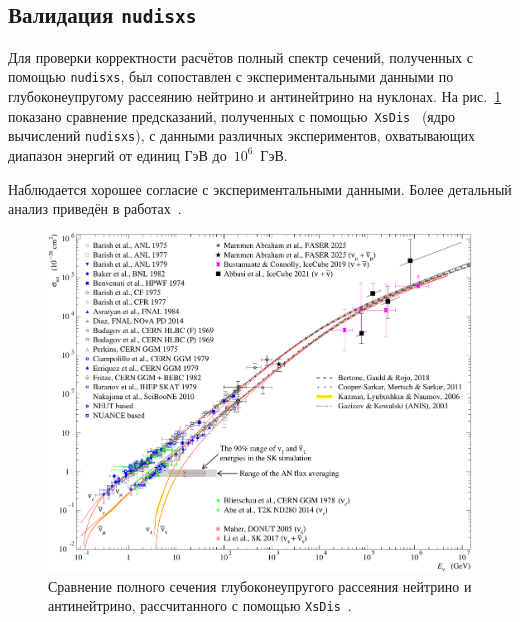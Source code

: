\subsection{Валидация \texttt{nudisxs}}

Для проверки корректности расчётов полный спектр сечений, полученных с помощью \texttt{nudisxs}, был сопоставлен с экспериментальными данными по глубоконеупругому рассеянию нейтрино и антинейтрино на нуклонах. 
На рис.~\ref{fig:disxs_compare} показано сравнение предсказаний, полученных с помощью~\texttt{XsDis}~\cite{kuzmin2006_finetuning,kuzmin2005_sumcc,kuzmin2006_axialmass} (ядро вычислений \texttt{nudisxs}), с данными различных экспериментов, охватывающих диапазон энергий от единиц ГэВ до~$10^6$~ГэВ.

Наблюдается хорошее согласие с экспериментальными данными. Более детальный анализ приведён в работах~\cite{kuzmin2006_finetuning,kuzmin2005_sumcc,kuzmin2006_axialmass}.

\begin{figure}[!h]
\centering
\includegraphics[width=\linewidth]{images/dis_vs_data.pdf}
\caption{Сравнение полного сечения глубоконеупругого рассеяния нейтрино и антинейтрино, рассчитанного с помощью \texttt{XsDis}~\cite{kuzmin2006_finetuning,kuzmin2005_sumcc,kuzmin2006_axialmass}.}
\label{fig:disxs_compare}
\end{figure}

